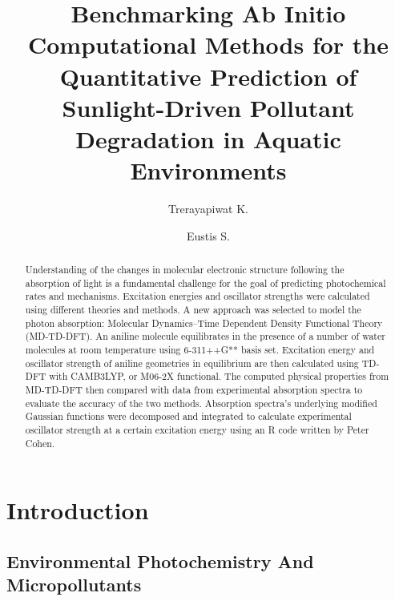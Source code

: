 \documentclass[
journal=jpcbfk, %
manuscript=article]{achemso}
\author{Trerayapiwat K.}
\affiliation[Bowdoin College]
{Department of Chemistry, Bowdoin College, Brunswick, ME}
\author{Eustis S.}
\affiliation[Bowdoin College]
{Department of Chemistry, Bowdoin College, Brunswick, ME}
\title[\texttt{achemso} demonstration]
{Benchmarking Ab Initio Computational Methods for the Quantitative Prediction of Sunlight-Driven Pollutant Degradation in Aquatic Environments}
\begin{document}
\begin{abstract}
Understanding of the changes in molecular electronic structure following the absorption of light is a fundamental challenge for the goal of predicting photochemical rates and mechanisms. Excitation energies and oscillator strengths were calculated using different theories and methods. A new approach was selected to model the photon absorption: Molecular Dynamics–Time Dependent Density Functional Theory (MD-TD-DFT). An aniline molecule equilibrates in the presence of a number of water molecules at room temperature using 6-311++G** basis set. Excitation energy and oscillator strength of aniline geometries in equilibrium are then calculated using TD-DFT with CAMB3LYP, or M06-2X functional. The computed physical properties from MD-TD-DFT then compared with data from experimental absorption spectra to evaluate the accuracy of the two methods. Absorption spectra’s underlying modified Gaussian functions were decomposed and integrated to calculate experimental oscillator strength at a certain excitation energy using an R code written by Peter Cohen.
\end{abstract}


\section{Introduction}

\subsection{Environmental Photochemistry And Micropollutants}
\end{document}
